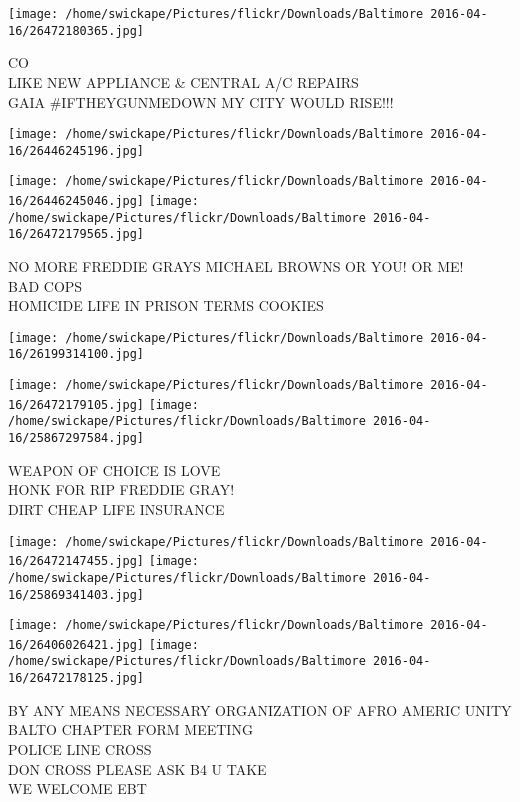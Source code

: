 \documentclass[10pt,letterpaper]{article}
\begin{document}
\vspace{0.25in}
\texttt{[image: /home/swickape/Pictures/flickr/Downloads/Baltimore 2016-04-16/26472180365.jpg]}

CO\\
LIKE NEW APPLIANCE \& CENTRAL A/C REPAIRS\\
GAIA \#IFTHEYGUNMEDOWN MY CITY WOULD RISE!!!\\
\pagebreak

\texttt{[image: /home/swickape/Pictures/flickr/Downloads/Baltimore 2016-04-16/26446245196.jpg]}

\vspace{0.25in}
\texttt{[image: /home/swickape/Pictures/flickr/Downloads/Baltimore 2016-04-16/26446245046.jpg]}
\texttt{[image: /home/swickape/Pictures/flickr/Downloads/Baltimore 2016-04-16/26472179565.jpg]}

NO MORE FREDDIE GRAYS MICHAEL BROWNS OR YOU!  OR ME!\\
BAD COPS\\
HOMICIDE LIFE IN PRISON TERMS COOKIES\\
\pagebreak

\texttt{[image: /home/swickape/Pictures/flickr/Downloads/Baltimore 2016-04-16/26199314100.jpg]}

\vspace{0.25in}
\texttt{[image: /home/swickape/Pictures/flickr/Downloads/Baltimore 2016-04-16/26472179105.jpg]}
\texttt{[image: /home/swickape/Pictures/flickr/Downloads/Baltimore 2016-04-16/25867297584.jpg]}

WEAPON OF CHOICE IS LOVE\\
HONK FOR RIP FREDDIE GRAY!\\
DIRT CHEAP LIFE INSURANCE\\
\pagebreak

\texttt{[image: /home/swickape/Pictures/flickr/Downloads/Baltimore 2016-04-16/26472147455.jpg]}
\texttt{[image: /home/swickape/Pictures/flickr/Downloads/Baltimore 2016-04-16/25869341403.jpg]}

\texttt{[image: /home/swickape/Pictures/flickr/Downloads/Baltimore 2016-04-16/26406026421.jpg]}
\texttt{[image: /home/swickape/Pictures/flickr/Downloads/Baltimore 2016-04-16/26472178125.jpg]}

BY ANY MEANS NECESSARY ORGANIZATION OF AFRO AMERIC UNITY BALTO CHAPTER FORM MEETING\\
POLICE LINE CROSS\\
DON CROSS PLEASE ASK B4 U TAKE\\
WE WELCOME EBT\\
\pagebreak
\end{document}
